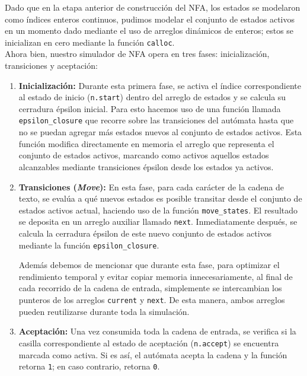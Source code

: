 \documentclass[12pt, letterpaper]{article}
\begin{document}
\noindent Dado que en la etapa anterior de construcción del NFA, los estados se modelaron como índices enteros continuos, pudimos modelar el conjunto de estados activos en un momento dado mediante el uso de arreglos dinámicos de enteros; estos se inicializan en cero mediante la función \texttt{calloc}.\\

\noindent Ahora bien, nuestro simulador de NFA opera en tres fases: inicialización, transiciones y aceptación: 

\begin{enumerate}
    \item \textbf{Inicialización:} Durante esta primera fase, se activa el índice correspondiente al estado de inicio (\texttt{n.start}) dentro del arreglo de estados y se calcula su cerradura épsilon inicial. Para esto hacemos uso de una función llamada \texttt{epsilon\_closure} que recorre sobre las transiciones del autómata hasta que no se puedan agregar más estados nuevos al conjunto de estados activos. Esta función modifica directamente en memoria el arreglo que representa el conjunto de estados activos, marcando como activos aquellos estados alcanzables mediante transiciones épsilon desde los estados ya activos.
    
    \item \textbf{Transiciones (\textit{Move}):} En esta fase, para cada carácter de la cadena de texto, se evalúa a qué nuevos estados es posible transitar desde el conjunto de estados activos actual, haciendo uso de la función \texttt{move\_states}. El resultado se deposita en un arreglo auxiliar llamado \texttt{next}. Inmediatamente después, se calcula la cerradura épsilon de este nuevo conjunto de estados activos mediante la función \texttt{epsilon\_closure}.
    
    Además debemos de mencionar que durante esta fase, para optimizar el rendimiento temporal y evitar copiar memoria innecesariamente, al final de cada recorrido de la cadena de entrada, simplemente se intercambian los punteros de los arreglos \texttt{current} y \texttt{next}. De esta manera, ambos arreglos pueden reutilizarse durante toda la simulación.
    
    \item \textbf{Aceptación:} Una vez consumida toda la cadena de entrada, se verifica si la casilla correspondiente al estado de aceptación (\texttt{n.accept}) se encuentra marcada como activa. Si es así, el autómata acepta la cadena y la función retorna \texttt{1}; en caso contrario, retorna \texttt{0}.
\end{enumerate}
\end{document}
